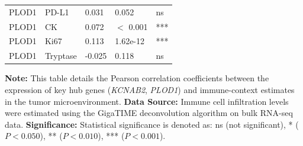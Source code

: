 \documentclass[a4paper,12pt]{article}
\begin{document}
{\begin{longtable}{p{2.5cm}p{4.5cm}p{2.2cm}p{2.2cm}p{2.2cm}}
    PLOD1    & PD-L1                   & 0.031     & 0.052     & ns                                              \\
    PLOD1    & CK                      & 0.072     & $<$ 0.001 & ***                                             \\
    PLOD1    & Ki67                    & 0.113     & 1.62e-12  & ***                                             \\
    PLOD1    & Tryptase                & -0.025    & 0.118     & ns                                              \\
  \end{longtable}
}

\vspace{1em}
\noindent\small \textbf{Note:} This table details the Pearson correlation coefficients between the expression of key hub genes (\textit{KCNAB2}, \textit{PLOD1}) and immune-context estimates in the tumor microenvironment.
\textbf{Data Source:} Immune cell infiltration levels were estimated using the GigaTIME deconvolution algorithm on bulk RNA-seq data.
\textbf{Significance:} Statistical significance is denoted as: ns (not significant), * ($P < 0.050$), ** ($P < 0.010$), *** ($P < 0.001$).
\newpage
\end{document}
